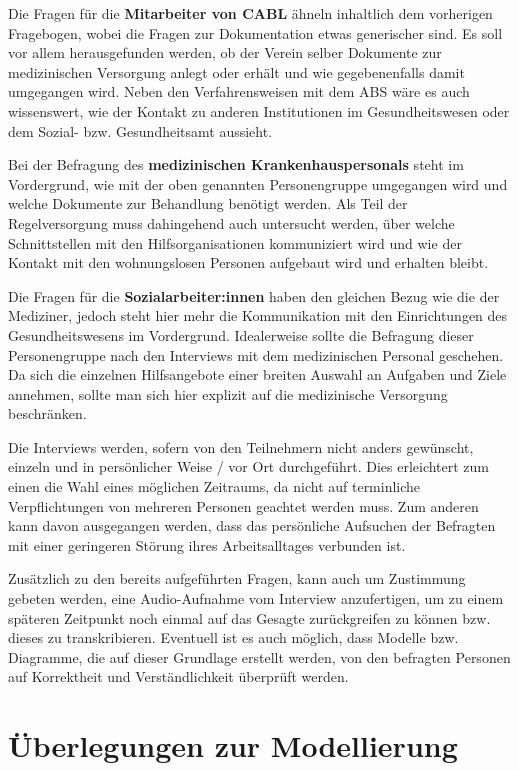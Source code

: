 Die Fragen für die \textbf{Mitarbeiter von CABL} ähneln inhaltlich dem vorherigen Fragebogen, wobei die Fragen zur Dokumentation etwas generischer sind. Es soll vor allem herausgefunden werden, ob der Verein selber Dokumente zur medizinischen Versorgung anlegt oder erhält und wie gegebenenfalls damit umgegangen wird. Neben den Verfahrensweisen mit dem \ac{ABS} wäre es auch wissenswert, wie der Kontakt zu anderen Institutionen im Gesundheitswesen oder dem Sozial- bzw. Gesundheitsamt aussieht.

Bei der Befragung des \textbf{medizinischen Krankenhauspersonals} steht im Vordergrund, wie mit der oben genannten Personengruppe umgegangen wird und welche Dokumente zur Behandlung benötigt werden. Als Teil der Regelversorgung muss dahingehend auch untersucht werden, über welche Schnittstellen mit den Hilfsorganisationen kommuniziert wird und wie der Kontakt mit den wohnungslosen Personen aufgebaut wird und erhalten bleibt.

Die Fragen für die \textbf{Sozialarbeiter:innen} haben den gleichen Bezug wie die der Mediziner, jedoch steht hier mehr die Kommunikation mit den Einrichtungen des Gesundheitswesens im Vordergrund. Idealerweise sollte die Befragung dieser Personengruppe nach den Interviews mit dem medizinischen Personal geschehen. Da sich die einzelnen Hilfsangebote einer breiten Auswahl an Aufgaben und Ziele annehmen, sollte man sich hier explizit auf die medizinische Versorgung beschränken.

Die Interviews werden, sofern von den Teilnehmern nicht anders gewünscht, einzeln und in persönlicher Weise / vor Ort durchgeführt. Dies erleichtert zum einen die Wahl eines möglichen Zeitraums, da nicht auf terminliche Verpflichtungen von mehreren Personen geachtet werden muss. Zum anderen kann davon ausgegangen werden, dass das persönliche Aufsuchen der Befragten mit einer geringeren Störung ihres Arbeitsalltages verbunden ist.

Zusätzlich zu den bereits aufgeführten Fragen, kann auch um Zustimmung gebeten werden, eine Audio-Aufnahme vom Interview anzufertigen, um zu einem späteren Zeitpunkt noch einmal auf das Gesagte zurückgreifen zu können bzw. dieses zu transkribieren. Eventuell ist es auch möglich, dass Modelle bzw. Diagramme, die auf dieser Grundlage erstellt werden, von den befragten Personen auf Korrektheit und Verständlichkeit überprüft werden.


\section{Überlegungen zur Modellierung}\label{sec:model}

